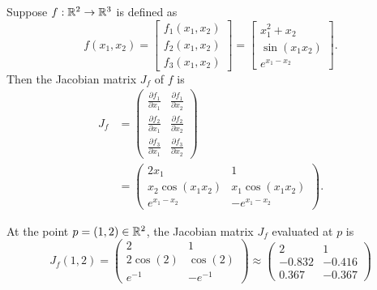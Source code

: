 \begin{example}
Suppose $f:\mathbb{R}^2\to\mathbb{R}^3$ is defined as 
$$f(x_1,x_2) = \left[\begin{array}{c}f_1(x_1,x_2) \\ f_2(x_1,x_2) \\ f_3(x_1,x_2)\end{array}\right] = \left[\begin{array}{c}x_1^2 + x_2 \\ \sin(x_1x_2) \\ e^{x_1-x_2}\end{array}\right].$$
Then the Jacobian matrix $J_f$ of $f$ is
\begin{align*}
    J_f &= \left(\begin{array}{cc}
        \frac{\partial f_1}{\partial x_1} & \frac{\partial f_1}{\partial x_2} \\
        \frac{\partial f_2}{\partial x_1} & \frac{\partial f_2}{\partial x_2} \\
        \frac{\partial f_3}{\partial x_1} & \frac{\partial f_3}{\partial x_2}
    \end{array}\right) \\
    &= \left(\begin{array}{cc}
        2x_1 & 1 \\
        x_2\cos(x_1x_2) & x_1\cos(x_1x_2) \\
        e^{x_1-x_2} & -e^{x_1-x_2}
    \end{array}\right).
\end{align*}

At the point $p=(1,2)\in \mathbb{R}^2$, the Jacobian matrix $J_f$ evaluated at $p$ is
$$
J_f(1,2) = \left(\begin{array}{cc}
    2 & 1 \\
    2\cos(2) & \cos(2) \\
    e^{-1} & -e^{-1}
\end{array}\right) \approx \left(\begin{array}{cc}2 & 1 \\ -0.832 & -0.416 \\ 0.367 & -0.367\end{array}\right)
$$
\end{example}

